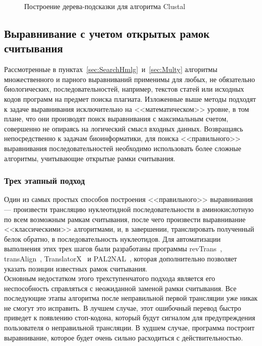 \begin{figure}[h]
	\caption{Построение дерева-подсказки для алгоритма Clustal}
	\label{ris:Clustal}
\end{figure}

\subsection[Выравнивание с учетом открытых рамок считывания]{\large Выравнивание с учетом открытых рамок считывания}
\hspace{\parindent} Рассмотренные в пунктах~\ref{sec:SearchHmlg}~и~\ref{sec:Multy} алгоритмы множественного и парного выравниваний применимы для любых, не обязательно биологических, последовательностей, например, текстов статей или исходных кодов программ на предмет поиска плагиата. Изложенные выше методы подходят к задаче выравнивания исключительно на <<математическом>> уровне, в том плане, что они производят поиск выравнивания с максимальным счетом, совершенно не опираясь на логический смысл входных данных. Возвращаясь непосредственно к задачам биоинформатики, для поиска <<правильного>> выравнивания последовательностей необходимо использовать более сложные алгоритмы, учитывающие открытые рамки считывания.

\subsubsection[Трех этапный подход]{\large Трех этапный подход}
\hspace{\parindent} Один из самых простых способов построения <<правильного>> выравнивания --- произвести трансляцию нуклеотидной последовательности в аминокислотную по всем возможным рамкам считывания, после чего произвести выравнивание <<классическими>> алгоритмами, и, в завершении, транслировать полученный белок обратно, в последовательность нуклеотидов. Для автоматизации выполнения этих трех шагов были разработаны программы revTrans~\cite{RevTrans}, transAlign~\cite{transAlign}, TranslatorX~\cite{TranslatorX} и PAL2NAL~\cite{PAL2NAL}, которая дополнительно позволяет указать позиции известных рамок считывания. \\
\indent Основным недостатком этого трехступенчатого подхода является его неспособность справляться с неожиданной заменой рамки считывания. Все последующие этапы алгоритма после неправильной первой трансляции уже никак не смогут это исправить. В лучшем случае, этот ошибочный перевод быстро приведет к появлению стоп-кодона, который будут сигналом для предупреждения пользователя о неправильной трансляции. В худшем случае, программа построит выравнивание, которое будет очень сильно расходиться с действительностью.

